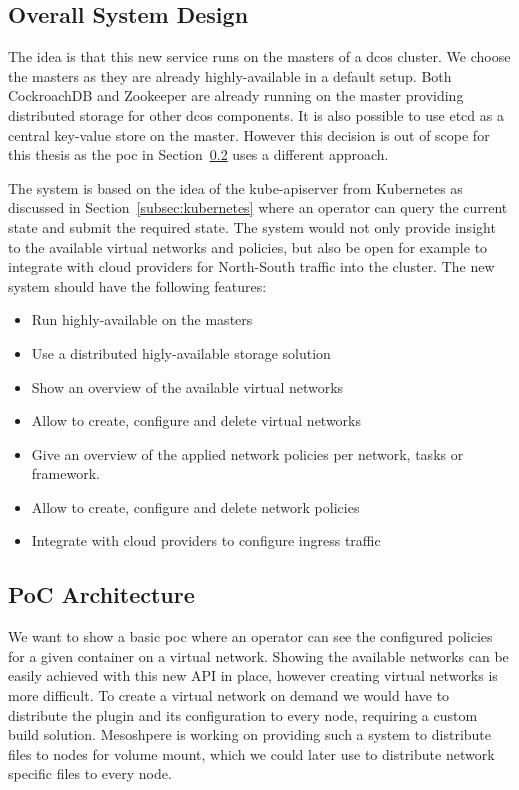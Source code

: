 \subsection{Overall System Design}
\label{subsec:system-design}
The idea is that this new service runs on the masters of a \gls{dcos} cluster. We choose the masters as they are already highly-available in a default setup. Both CockroachDB\cite{cockroachdb} and Zookeeper\cite{zookeeper} are already running on the master providing distributed storage for other \gls{dcos} components. It is also possible to use etcd\cite{etcd} as a central key-value store on the master. However this decision is out of scope for this thesis as the \gls{poc} in Section~\ref{subsec:poc-architecture} uses a different approach.

The system is based on the idea of the kube-apiserver from Kubernetes as discussed in Section~\ref{subsec:kubernetes} where an operator can query the current state and submit the required state. The system would not only provide insight to the available virtual networks and policies, but also be open for example to integrate with cloud providers for North-South traffic into the cluster. The new system should have the following features: 
\begin{itemize}
    \item Run highly-available on the masters
    \item Use a distributed higly-available storage solution
    \item Show an overview of the available virtual networks
    \item Allow to create, configure and delete virtual networks
    \item Give an overview of the applied network policies per network, tasks or framework.
    \item Allow to create, configure and delete network policies
    \item Integrate with cloud providers to configure ingress traffic
\end{itemize}

\subsection{PoC Architecture}
\label{subsec:poc-architecture}
We want to show a basic \gls{poc}  where an operator can see the configured policies for a given container on a virtual network. Showing the available networks can be easily achieved with this new API in place, however creating virtual networks is more difficult. To create a virtual network on demand we would have to distribute the plugin and its configuration to every node, requiring a custom build solution. Mesoshpere is working on providing such a system to distribute files to nodes for volume mount, which we could later use to distribute network specific files to every node.

